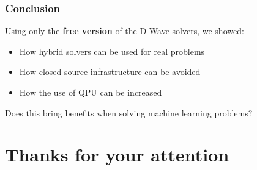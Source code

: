 \documentclass[aspectratio=169]{beamer}
\begin{document}
\begin{frame}
    \frametitle{Conclusion}

    Using only the \textbf{free version} of the D-Wave solvers, we showed:

    \begin{itemize}
        \item How hybrid solvers can be used for real problems
        \item How closed source infrastructure can be avoided
        \item How the use of QPU can be increased
    \end{itemize}

    \vspace{1cm}

    Does this bring benefits when solving machine learning problems?

\end{frame}

\section{Thanks for your attention}
\end{document}
